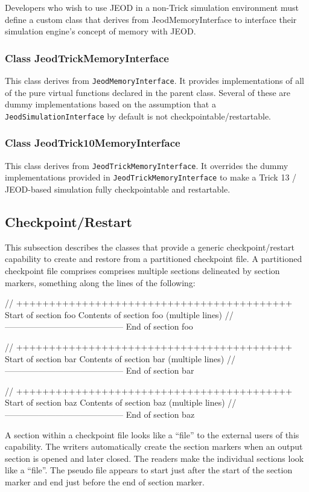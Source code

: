 Developers who wish to use JEOD in a non-Trick simulation environment
must define a custom class that derives from JeodMemoryInterface
to interface their simulation engine's concept of memory with JEOD.

\subsubsection{Class JeodTrickMemoryInterface}
This class derives from \verb|JeodMemoryInterface|. It provides implementations
of all of the pure virtual functions declared in the parent class.
Several of these are dummy implementations based on the assumption
that a \verb|JeodSimulationInterface| by default is not
checkpointable/restartable.

\subsubsection{Class JeodTrick10MemoryInterface}
This class derives from \verb|JeodTrickMemoryInterface|. It overrides the dummy
implementations provided in \verb|JeodTrickMemoryInterface| to make a
Trick 13 / JEOD-based simulation fully checkpointable and restartable.


\subsection{Checkpoint/Restart}
This subsection describes the classes that provide a generic checkpoint/restart
capability to create and restore from a partitioned checkpoint file.
A partitioned checkpoint file comprises comprises multiple sections delineated
by section markers, something along the lines of the following:
\begin{codeblock}
// ++++++++++++++++++++++++++++++++++++++++++ Start of section foo
Contents of section foo (multiple lines)
// ------------------------------------------ End of section foo

// ++++++++++++++++++++++++++++++++++++++++++ Start of section bar
Contents of section bar (multiple lines)
// ------------------------------------------ End of section bar

// ++++++++++++++++++++++++++++++++++++++++++ Start of section baz
Contents of section baz (multiple lines)
// ------------------------------------------ End of section baz
\end{codeblock}

A section within a checkpoint file looks like a ``file'' to the
external users of this capability. The writers automatically create
the section markers when an output section is opened and later closed.
The readers make the individual sections look like a ``file''.
The pseudo file appears to start just after the start of the section marker
and end just before the end of section marker.

